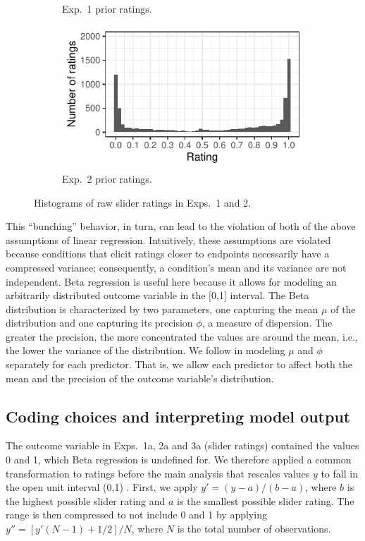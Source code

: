 \documentclass[11pt,fleqn]{article}
\newcommand{\6}{\mbox{$[\hspace*{-.6mm}[$}}
\newcommand{\9}{\mbox{$]\hspace*{-.6mm}]$}}
\begin{document}
\begin{figure}[h!]
\begin{subfigure}{.33\textwidth}
\caption{Exp.~1 prior ratings.}
\label{fig:exp2araw}
\end{subfigure}
\begin{subfigure}{.33\textwidth}
\includegraphics[width=\textwidth]{../../results/2-veridicality2/graphs/bunching}
\caption{Exp.~2 prior ratings.}
\label{fig:exp3araw}
\end{subfigure}
\caption{Histograms of raw slider ratings in Exps.~1 and 2.}
\label{fig:bunch}
\end{figure}

This ``bunching'' behavior, in turn, can lead to the violation of both of the above assumptions of linear regression. 
Intuitively, these assumptions are violated because conditions that elicit ratings closer to endpoints necessarily have a compressed variance; consequently, a condition's mean and its variance are not independent. Beta regression is useful here because it allows for modeling an arbitrarily distributed outcome variable in the $[$0,1$]$ interval. The Beta distribution is characterized by two parameters, one capturing the mean $\mu$ of the distribution and one capturing its precision $\phi$, a measure of dispersion. The greater the precision, the more concentrated the values are around the mean, i.e., the lower the variance of the distribution.  We follow  in modeling $\mu$ and $\phi$ separately for each predictor. That is, we allow each predictor to affect both the mean and the precision of the outcome variable's distribution. 

\subsection{Coding choices and interpreting model output}\label{a-primer}

The outcome variable in Exps.~1a, 2a and 3a (slider ratings) contained the values 0 and 1, which Beta regression is undefined for. We therefore applied a common transformation to ratings before the main analysis that rescales values $y$ to fall in the open unit interval (0,1)  \cite{smithson2006}. First, we apply $y' = (y-a)/(b-a)$, where $b$ is the highest possible slider rating and $a$ is the smallest possible slider rating. The range is then compressed to not include 0 and 1 by applying $y'' = [y'(N-1) + 1/2]/N$, where $N$ is the total number of observations.
\end{document}
